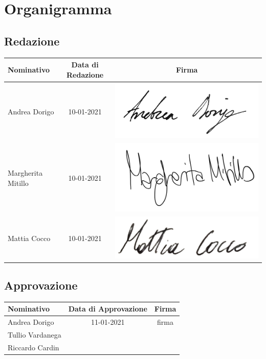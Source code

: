 \chapter{Organigramma}\label{Organigramma}

\section{Redazione}\label{OrganigrammaRedazione}
\quad
\def\tabularxcolumn#1{m{#1}}
{	
	\begin{center}
		\renewcommand{\arraystretch}{1.4}
		\begin{tabularx}{\textwidth}{|X|c|c|}
			\hline
			\rowcolor{airforceblue}
			\textbf{Nominativo} & \textbf{Data di Redazione} & \textbf{Firma}\\
			\hline
			Andrea Dorigo & 10-01-2021 & \includegraphics[width=0.2\linewidth]{../immagini/firme/firma_andrea_dorigo.png}\\
			\hline
			Margherita Mitillo & 10-01-2021 & \includegraphics[width=0.2\linewidth]{../immagini/firme/firma_margherita.png}\\
			\hline
			Mattia Cocco & 10-01-2021 &\includegraphics[width=0.2\linewidth]{../immagini/firme/firma_mattia.png}\\
			\hline
		\end{tabularx}
	\end{center}

\section{Approvazione}\label{OrganigrammaApprovazione}
\quad
\def\tabularxcolumn#1{m{#1}}
{	
	\begin{center}
		\renewcommand{\arraystretch}{1.4}
		\begin{tabularx}{\textwidth}{|X|c|c|}
			\hline
			\rowcolor{airforceblue}
			\textbf{Nominativo} & \textbf{Data di Approvazione} & \textbf{Firma}\\
			\hline
			Andrea Dorigo & 11-01-2021 & firma\\
			\hline
			Tullio Vardanega & &\\
			Riccardo Cardin & &\\
			\hline
		\end{tabularx}
	\end{center}

}}
